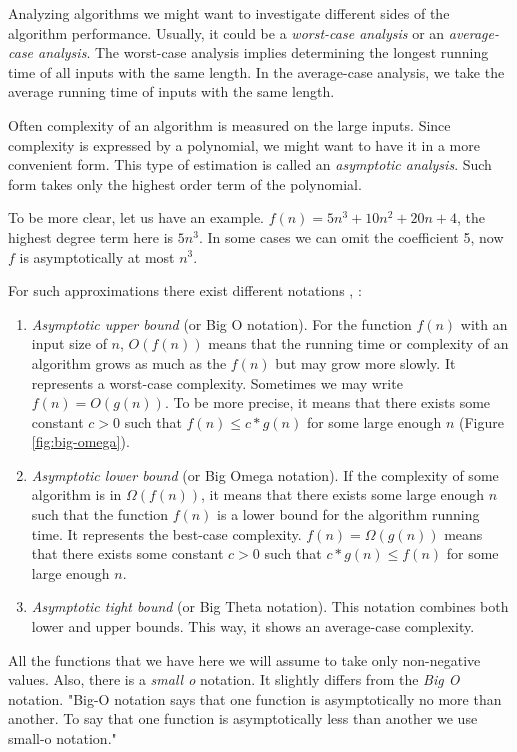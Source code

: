\documentclass[
  field=inf,
  biblatex,
  language=english,
  glossaries,
  theorems=false,
  sourcecodes=false,
  index
]{kidiplom}
\begin{document}
Analyzing algorithms we might want to investigate different sides of the algorithm performance. Usually, it could be a \textit{worst-case analysis} or an \textit{average-case analysis}. The worst-case analysis implies determining the longest running time of all inputs with the same length. In the average-case analysis, we take the average running time of inputs with the same length.

Often complexity of an algorithm is measured on the large inputs. Since complexity is expressed by a polynomial, we might want to have it in a more convenient form. This type of estimation is called an \textit{asymptotic analysis}. Such form takes only the highest order term of the polynomial.

To be more clear, let us have an example. $f(n) = 5n^3 + 10n^2 + 20n + 4$, the highest degree term here is $5n^3$. In some cases we can omit the coefficient 5, now $f$ is asymptotically at most $n^3$.

For such approximations there exist different notations \cite{knuth1}, \cite{sipser}:

\begin{enumerate}
	\item \textit{Asymptotic upper bound} (or Big O notation). For the function $f(n)$ with an input size of $n$, $O(f(n))$ means that the running time or complexity of an algorithm grows as much as the $f(n)$ but may grow more slowly. It represents a worst-case complexity. Sometimes we may write $f(n) = O(g(n))$. To be more precise, it means that there exists some constant $c > 0$ such that $f(n) \leq c * g(n)$ for some large enough $n$ (Figure \ref{fig:big-omega}).
	\item \textit{Asymptotic lower bound} (or Big Omega notation). If the complexity of some algorithm is in $\Omega(f(n))$, it means that there exists some large enough $n$ such that the function $f(n)$ is a lower bound for the algorithm running time. It represents the best-case complexity. $f(n) = \Omega(g(n))$ means that there exists some constant $c > 0$ such that $c * g(n) \leq f(n)$ for some large enough $n$.
	\item \textit{Asymptotic tight bound} (or Big Theta notation). This notation combines both lower and upper bounds. This way, it shows an average-case complexity.
\end{enumerate}

All the functions that we have here we will assume to take only non-negative values. Also, there is a \textit{small o} notation. It slightly differs from the \textit{Big O} notation. "Big-O notation says that one function is asymptotically no more than  another. To say that one  function is asymptotically less than another we use small-o notation."\cite{sipser}
\end{document}
